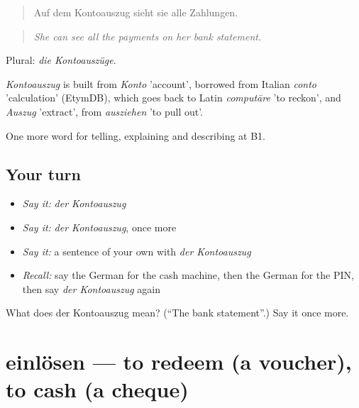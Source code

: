 \begin{quote}
Auf dem Kontoauszug sieht sie alle Zahlungen.
\end{quote}

\begin{quote}
\emph{She can see all the payments on her bank statement.}
\end{quote}

Plural: \emph{die Kontoauszüge}.

\begin{cousinweb}
\emph{Kontoauszug} is built from \emph{Konto} 'account', borrowed from Italian \emph{conto} 'calculation' (EtymDB), which goes back to Latin \emph{computāre} 'to reckon', and \emph{Auszug} 'extract', from \emph{ausziehen} 'to pull out'.
\end{cousinweb}

\begin{grammarlens}[title={What you've built}]
One more word for telling, explaining and describing at B1.
\end{grammarlens}

\subsection*{Your turn}
\begin{itemize}
\raggedright
  \item \emph{Say it:} \emph{der Kontoauszug}
  \item \emph{Say it:} \emph{der Kontoauszug}, once more
  \item \emph{Say it:} a sentence of your own with \emph{der Kontoauszug}
  \item \emph{Recall:} say the German for the cash machine, then the German for the PIN, then say \emph{der Kontoauszug} again
\end{itemize}

\begin{tcolorbox}[breakable,colback=teal!4,colframe=teal!35!black,title={Before you move on}]
What does der Kontoauszug mean? (\textquotedblleft{}The bank statement\textquotedblright{}.) Say it once more.
\end{tcolorbox}
\section[einlösen]{einlösen — to redeem (a voucher), to cash (a cheque)}

\label{lesson:GE-C450-einloesen}



